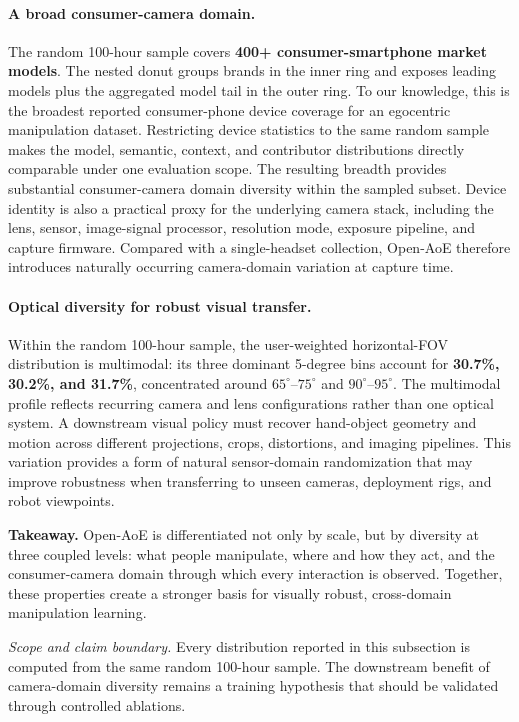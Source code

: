 \paragraph{A broad consumer-camera domain.}
The random 100-hour sample covers \textbf{400+ consumer-smartphone market models}. The nested donut groups brands in the inner ring and exposes leading models plus the aggregated model tail in the outer ring.
To our knowledge, this is the broadest reported consumer-phone device coverage for an egocentric manipulation dataset.
Restricting device statistics to the same random sample makes the model, semantic, context, and contributor distributions directly comparable under one evaluation scope.
The resulting breadth provides substantial consumer-camera domain diversity within the sampled subset.
Device identity is also a practical proxy for the underlying camera stack, including the lens, sensor, image-signal processor, resolution mode, exposure pipeline, and capture firmware.
Compared with a single-headset collection, Open-AoE therefore introduces naturally occurring camera-domain variation at capture time.

\paragraph{Optical diversity for robust visual transfer.}
Within the random 100-hour sample, the user-weighted horizontal-FOV distribution is multimodal: its three dominant 5-degree bins account for \textbf{30.7\%, 30.2\%, and 31.7\%}, concentrated around $65^{\circ}$--$75^{\circ}$ and $90^{\circ}$--$95^{\circ}$.
The multimodal profile reflects recurring camera and lens configurations rather than one optical system.
A downstream visual policy must recover hand-object geometry and motion across different projections, crops, distortions, and imaging pipelines.
This variation provides a form of natural sensor-domain randomization that may improve robustness when transferring to unseen cameras, deployment rigs, and robot viewpoints.

\textbf{Takeaway.} Open-AoE is differentiated not only by scale, but by diversity at three coupled levels: what people manipulate, where and how they act, and the consumer-camera domain through which every interaction is observed.
Together, these properties create a stronger basis for visually robust, cross-domain manipulation learning.

\textit{Scope and claim boundary.} Every distribution reported in this subsection is computed from the same random 100-hour sample. The downstream benefit of camera-domain diversity remains a training hypothesis that should be validated through controlled ablations.
